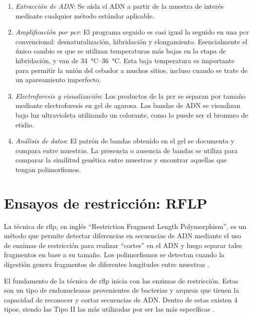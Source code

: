 \documentclass{AsignaturaResumen}
\begin{document}
\begin{enumerate}
    \item \emph{Extracción de ADN}: Se aísla el ADN a partir de la muestra de interés mediante cualquier método estándar aplicable.
    \item \emph{Amplificación por \acrshort{pcr}}: El programa seguido es casi igual la seguido en una \acrshort{pcr} convencional: desnaturalización, hibridación y elongamiento. Esencialmente el único cambio es que se utilizan temperaturas más bajas en la etapa de hibridación, y van de \qtyrange{34}{36}{\degreeCelsius}. Esta baja temperatura es importante para permitir la unión del cebador a muchos sitios, incluso cuando se trate de un apareamiento imperfecto.
    \item \emph{Electroforesis y visualización}: Los productos de la \acrshort{pcr} se separan por tamaño mediante electroforesis en gel de agarosa. Las bandas de ADN se visualizan bajo luz ultravioleta utilizando un colorante, como lo puede ser el bromuro de etidio.
    \item \emph{Análisis de datos}: El patrón de bandas obtenido en el gel se documenta y compara entre muestras. La presencia o ausencia de bandas se utiliza para comparar la similitud genética entre muestras y encontrar aquellas que tengan polimorfismos.
\end{enumerate}

    

    
    


\section{Ensayos de restricción: RFLP}

La técnica de \acrfull{rflp}, en inglés ``Restriction Fragment Length Polymorphism'', es un método que permite detectar diferencias en secuencias de ADN mediante el uso de enzimas de restricción para realizar ``cortes'' en el ADN y luego separar tales fragmentos en base a su tamaño. Los polimorfismos se detectan cuando la digestión genera fragmentos de diferentes longitudes entre muestras \citep{tarachApplicationPolymeraseChain2021}.

El fundamento de la técnica de \acrshort{rflp} inicia con las enzimas de restricción. Estas son un tipo de endonucleasas provenientes de bacterias y arqueas que tienen la capacidad de reconocer y cortar secuencias de ADN. Dentro de estas existen 4 tipos, siendo las Tipo II las más utilizadas por ser las más específicas \citep{tarachApplicationPolymeraseChain2021}.
\end{document}
